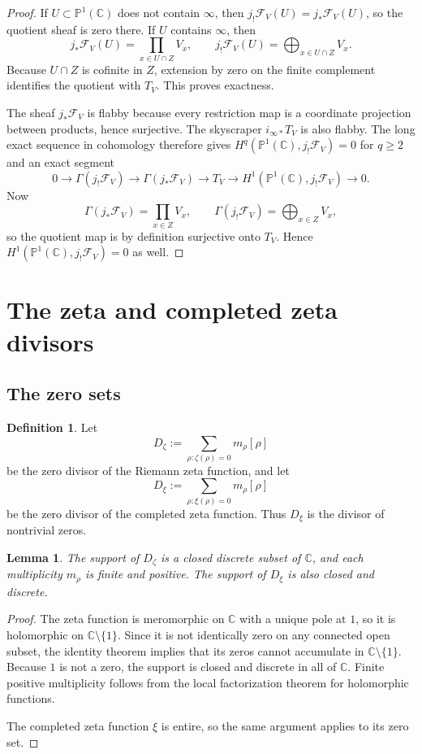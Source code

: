 \documentclass[11pt,a4paper]{article}
\newtheorem{lemma}[theorem]{Lemma}
\theoremstyle{definition}
\newtheorem{definition}[theorem]{Definition}
\theoremstyle{remark}
\newcommand{\CC}{\mathbb C}
\newcommand{\PP}{\mathbb P}
\newcommand{\cF}{\mathcal F}
\begin{document}
\begin{proof}
If $U\subset\PP^1(\CC)$ does not contain $\infty$, then $j_!\cF_V(U)=j_*\cF_V(U)$, so the quotient sheaf is zero there. If $U$ contains $\infty$, then
\[
j_*\cF_V(U)=\prod_{x\in U\cap Z}V_x,
\qquad
j_!\cF_V(U)=\bigoplus_{x\in U\cap Z}V_x.
\]
Because $U\cap Z$ is cofinite in $Z$, extension by zero on the finite complement identifies the quotient with $T_V$. This proves exactness.

The sheaf $j_*\cF_V$ is flabby because every restriction map is a coordinate projection between products, hence surjective. The skyscraper $i_{\infty *}T_V$ is also flabby. The long exact sequence in cohomology therefore gives $H^q(\PP^1(\CC),j_!\cF_V)=0$ for $q\ge2$ and an exact segment
\[
0\to \Gamma(j_!\cF_V)\to \Gamma(j_*\cF_V)\to T_V\to H^1(\PP^1(\CC),j_!\cF_V)\to 0.
\]
Now
\[
\Gamma(j_*\cF_V)=\prod_{x\in Z}V_x,
\qquad
\Gamma(j_!\cF_V)=\bigoplus_{x\in Z}V_x,
\]
so the quotient map is by definition surjective onto $T_V$. Hence $H^1(\PP^1(\CC),j_!\cF_V)=0$ as well.
\end{proof}

\section{The zeta and completed zeta divisors}

\subsection{The zero sets}

\begin{definition}
Let
\[
D_\zeta:=\sum_{\rho: \zeta(\rho)=0} m_\rho[\rho]
\]
be the zero divisor of the Riemann zeta function, and let
\[
D_\xi:=\sum_{\rho: \xi(\rho)=0} m_\rho[\rho]
\]
be the zero divisor of the completed zeta function. Thus $D_\xi$ is the divisor of nontrivial zeros.
\end{definition}

\begin{lemma}\label{lem:zeta-discrete}
The support of $D_\zeta$ is a closed discrete subset of $\CC$, and each multiplicity $m_\rho$ is finite and positive. The support of $D_\xi$ is also closed and discrete.
\end{lemma}

\begin{proof}
The zeta function is meromorphic on $\CC$ with a unique pole at $1$, so it is holomorphic on $\CC\setminus\{1\}$. Since it is not identically zero on any connected open subset, the identity theorem implies that its zeros cannot accumulate in $\CC\setminus\{1\}$. Because $1$ is not a zero, the support is closed and discrete in all of $\CC$. Finite positive multiplicity follows from the local factorization theorem for holomorphic functions.

The completed zeta function $\xi$ is entire, so the same argument applies to its zero set.
\end{proof}
\end{document}
